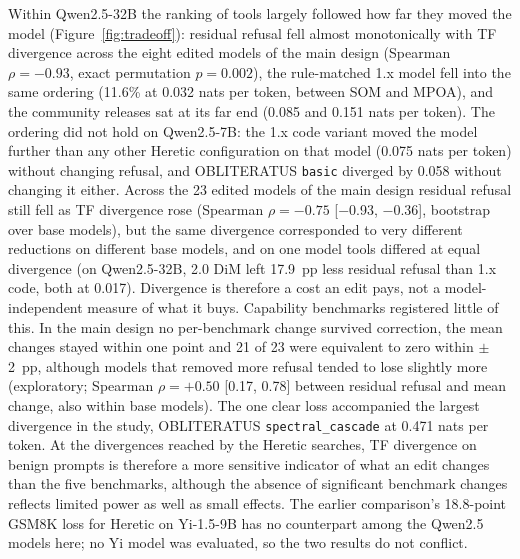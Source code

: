 Within Qwen2.5-32B the ranking of tools largely followed how far they moved the model (Figure~\ref{fig:tradeoff}):
residual refusal fell almost monotonically with TF divergence across the eight edited models of the main design
(Spearman $\rho=-0.93$, exact permutation $p=0.002$), the rule-matched 1.x model fell into the same ordering (11.6\% at 0.032 nats per token,
between SOM and MPOA), and the community releases sat at its far end (0.085 and 0.151 nats per token). The ordering
did not hold on Qwen2.5-7B: the 1.x code variant moved the model further than any other Heretic configuration on that
model (0.075 nats per token) without changing refusal, and OBLITERATUS \texttt{basic} diverged by 0.058 without
changing it either. Across the 23 edited models of the main design residual refusal still fell as TF divergence rose
(Spearman $\rho=-0.75$ [$-$0.93, $-$0.36], bootstrap over base models), but the same divergence corresponded to very different reductions on
different base models, and on one model tools differed at equal divergence (on Qwen2.5-32B, 2.0 DiM left 17.9~pp
less residual refusal than 1.x code, both at 0.017). Divergence is therefore a cost an edit pays, not a
model-independent measure of what it buys. Capability benchmarks registered little of this. In the main design no
per-benchmark change survived correction, the mean changes stayed within one point and 21 of 23 were equivalent to zero
within $\pm$2~pp, although models that removed more refusal tended to lose slightly more (exploratory; Spearman
$\rho=+0.50$ [0.17, 0.78] between residual refusal and mean change, also within base models). The one clear loss accompanied the largest divergence in the study, OBLITERATUS \texttt{spectral\_cascade}
at 0.471 nats per token. At the divergences reached by the Heretic searches, TF divergence on benign prompts is
therefore a more sensitive indicator of what an edit changes than the five benchmarks, although the absence of
significant benchmark changes reflects limited power as well as small effects. The earlier comparison's 18.8-point
GSM8K loss for Heretic on Yi-1.5-9B \cite{young2025comparative} has no counterpart among the Qwen2.5 models here; no
Yi model was evaluated, so the two results do not conflict.

